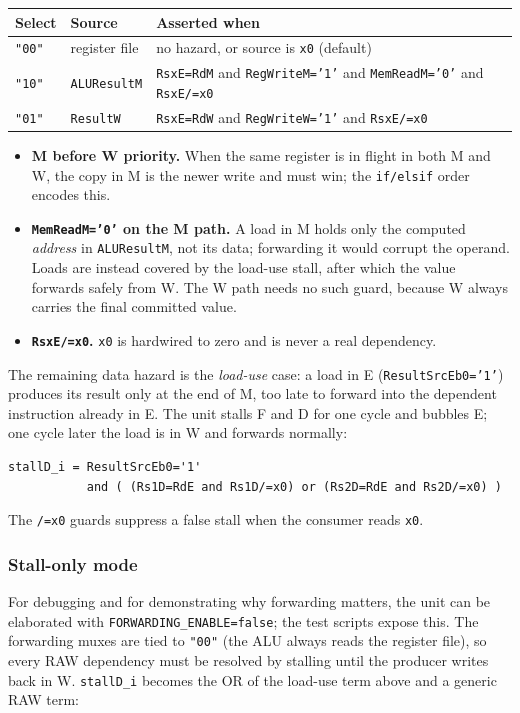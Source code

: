 \begin{center}
\begin{tabular}{@{}llp{}@{}}
\toprule
Select & Source & Asserted when \\
\midrule
\texttt{"00"} & register file & no hazard, or source is \texttt{x0} (default) \\
\texttt{"10"} & \texttt{ALUResultM} & \texttt{RsxE=RdM} and \texttt{RegWriteM='1'} and \texttt{MemReadM='0'} and \texttt{RsxE/=x0} \\
\texttt{"01"} & \texttt{ResultW}    & \texttt{RsxE=RdW} and \texttt{RegWriteW='1'} and \texttt{RsxE/=x0} \\
\bottomrule
\end{tabular}
\end{center}

\begin{itemize}[leftmargin=*]
  \item \textbf{M before W priority.} When the same register is in flight in
  both M and W, the copy in M is the newer write and must win; the
  \texttt{if/elsif} order encodes this.
  \item \textbf{\texttt{MemReadM='0'} on the M path.} A load in M holds only the
  computed \emph{address} in \texttt{ALUResultM}, not its data; forwarding it
  would corrupt the operand. Loads are instead covered by the load-use stall,
  after which the value forwards safely from W. The W path needs no such guard,
  because W always carries the final committed value.
  \item \textbf{\texttt{RsxE/=x0}.} \texttt{x0} is hardwired to zero and is
  never a real dependency.
\end{itemize}

The remaining data hazard is the \emph{load-use} case: a load in E
(\texttt{ResultSrcEb0='1'}) produces its result only at the end of M, too late
to forward into the dependent instruction already in E. The unit stalls F and D
for one cycle and bubbles E; one cycle later the load is in W and forwards
normally:

\begin{lstlisting}[style=minrv]
stallD_i = ResultSrcEb0='1'
           and ( (Rs1D=RdE and Rs1D/=x0) or (Rs2D=RdE and Rs2D/=x0) )
\end{lstlisting}

\noindent The \texttt{/=x0} guards suppress a false stall when the consumer
reads \texttt{x0}.

\subsubsection{Stall-only mode}
For debugging and for demonstrating why forwarding matters, the unit can be
elaborated with \texttt{FORWARDING\_ENABLE=false}; the test scripts expose this.
The forwarding muxes are tied to \texttt{"00"} (the ALU always reads the
register file), so every RAW dependency must be resolved by stalling until the
producer writes back in W. \texttt{stallD\_i} becomes the OR of the load-use
term above and a generic RAW term:

